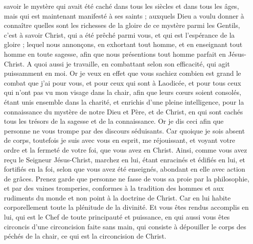 \begin{multicols}{2}
savoir le mystère qui avait été caché dans tous les siècles et dans tous les âges, mais qui est maintenant manifesté à ses saints ;
auxquels Dieu a voulu donner à connaître quelles sont les richesses de la gloire de ce mystère parmi les Gentils, c'est à savoir Christ, qui a été prêché parmi vous, et qui est l'espérance de la gloire ; 
lequel nous annonçons, en exhortant tout homme, et en enseignant tout homme en toute sagesse, afin que nous présentions tout homme parfait en Jésus-Christ.
A quoi aussi je travaille, en combattant selon son efficacité, qui agit puissamment en moi.
\VerseOne{}Or je veux en effet que vous sachiez combien est grand le combat que j'ai pour vous, et pour ceux qui sont à Laodicée, et pour tous ceux qui n'ont pas vu mon visage dans la chair,
afin que leurs cœurs soient consolés, étant unis ensemble dans la charité, et enrichis d'une pleine intelligence, pour la connaissance du mystère de notre Dieu et Père, et de Christ,
en qui sont cachés tous les trésors de la sagesse et de la connaissance.
Or je dis ceci afin que personne ne vous trompe par des discours séduisants.
Car quoique je sois absent de corps, toutefois je suis avec vous en esprit, me réjouissant, et voyant votre ordre et la fermeté de votre foi, que vous avez en Christ.
Ainsi, comme vous avez reçu le Seigneur Jésus-Christ, marchez en lui,
étant enracinés et édifiés en lui, et fortifiés en la foi, selon que vous avez été enseignés, abondant en elle avec action de grâces.
Prenez garde que personne ne fasse de vous sa proie par la philosophie, et par des vaines tromperies, conformes à la tradition des hommes et aux rudiments du monde et non point à la doctrine de Christ.
Car en lui habite corporellement toute la plénitude de la divinité.
Et vous êtes rendus accomplis en lui, qui est le Chef de toute principauté et puissance,
en qui aussi vous êtes circoncis d'une circoncision faite sans main, qui consiste à dépouiller le corps des péchés de la chair, ce qui est la circoncision de Christ.

\end{multicols}

